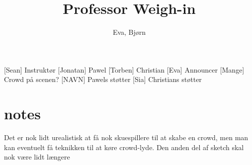 \documentclass[a4paper,11pt]{article}
\title{Professor Weigh-in}
\author{Eva, Bjørn}
\begin{document}
\maketitle

\begin{roles}
[Sean] Instruktør
[Jonatan] Pawel
[Torben] Christian
[Eva] Announcer 
[Mange] Crowd på scenen?
[NAVN] Pawels støtter
[Sia] Christians støtter 
\end{roles}

\begin{props}
\end{props}
\section*{notes}
Det er nok lidt urealistisk at få nok skuespillere til at skabe en crowd, men man kan eventuelt få teknikken til at køre crowd-lyde. Den anden del af sketch skal nok være lidt længere 
\end{document}
